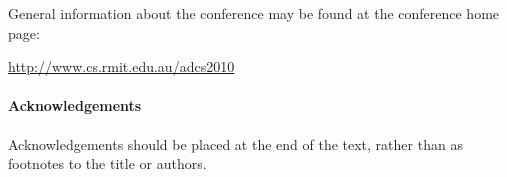 \documentclass[twocolumn]{article}
\begin{document}
General information about the conference may be found at the
conference home page: 

\begin{center}
\url{http://www.cs.rmit.edu.au/adcs2010}
\end{center}

\paragraph*{Acknowledgements}

Acknowledgements should be placed at the end of the text, rather than
as footnotes to the title or authors.

\begin{small}

\end{small}
\end{document}
